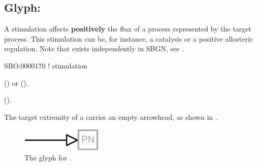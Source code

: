 \subsection{Glyph: }
\label{sec:stimulation}

A stimulation affects \textbf{positively} the flux of a process represented by the target process.
This stimulation can be, for instance, a catalysis or a positive allosteric regulation. Note that  exists independently in SBGN, see .

\begin{glyphDescription}

\glyphSboTerm
SBO:0000170 ! stimulation

\glyphOrigin
{}  () or   ().

\glyphTarget
{}  ().

\glyphSymbol
The target extremity of a  carries an empty arrowhead, as shown in .

\end{glyphDescription}

\begin{figure}[H]
  \centering
  \includegraphics{images/stimulation}
  \caption{The \PD glyph for .}
  \label{fig:stimulation}
\end{figure}
